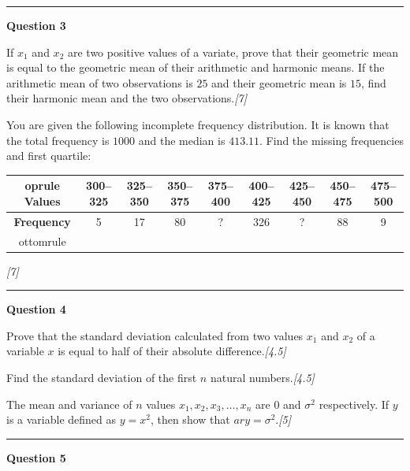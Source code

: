 \documentclass[11pt,a4paper]{article}
\newcommand{\pts}[1]{\hfill   \textit{[#1]}}
\begin{document}
\medskip\rule{\linewidth}{0.2pt}\medskip




\noindent   \textbf{Question 3}

\begin{parts}
  \item If $x_1$ and $x_2$ are two positive values of a variate, prove that their geometric mean is equal to the geometric mean of their arithmetic and harmonic means. If the arithmetic mean of two observations is $25$ and their geometric mean is $15$, find their harmonic mean and the two observations.\pts{7}
  \item You are given the following incomplete frequency distribution. It is known that the total frequency is $1000$ and the median is $413.11$. Find the missing frequencies and first quartile:
  
\begin{center}
  
\begin{tabular}{ccccccccc}
     oprule
   \textbf{Values} & 300--325 & 325--350 & 350--375 & 375--400 & 400--425 & 425--450 & 450--475 & 475--500 \\
    \midrule
   \textbf{Frequency} & 5 & 17 & 80 & ? & 326 & ? & 88 & 9 \\
    ottomrule
  \end{tabular}
  \end{center}\pts{7}
\end{parts}

\medskip\rule{\linewidth}{0.2pt}\medskip




\noindent   \textbf{Question 4}

\begin{parts}
  \item Prove that the standard deviation calculated from two values $x_1$ and $x_2$ of a variable $x$ is equal to half of their absolute difference.\pts{4.5}
  \item Find the standard deviation of the first $n$ natural numbers.\pts{4.5}
  \item The mean and variance of $n$ values $x_1, x_2, x_3, \dots, x_n$ are $0$ and $\sigma^2$ respectively. If $y$ is a variable defined as $y = x^2$, then show that $ar{y} = \sigma^2$.\pts{5}
\end{parts}

\medskip\rule{\linewidth}{0.2pt}\medskip




\noindent   \textbf{Question 5}
\end{document}
